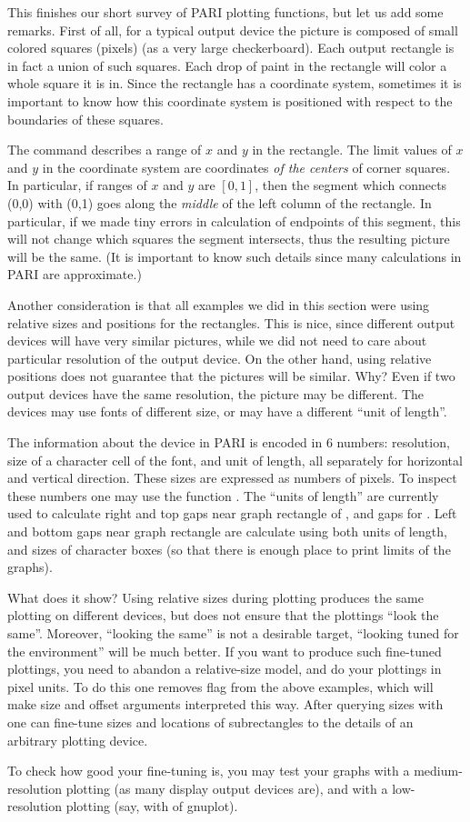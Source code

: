 This finishes our short survey of PARI plotting functions, but let us add
some remarks.  First of all, for a typical output device the picture is
composed of small colored squares (pixels) (as a very large checkerboard).
Each output rectangle is in fact a union of such squares.  Each drop
of paint in the rectangle will color a whole square it is in.  Since the
rectangle has a coordinate system, sometimes it is important to know how
this coordinate system is positioned with respect to the boundaries of
these squares.

The command  describes a range of $x$ and $y$ in the
rectangle.  The limit values of $x$ and $y$ in the coordinate system are
coordinates {\it of the centers} of corner squares.  In particular,
if ranges of $x$ and $y$ are $[0,1]$, then the segment which connects (0,0)
with (0,1) goes along the {\it middle} of the left column of the rectangle.
In particular, if we made tiny errors in calculation of endpoints of this
segment, this will not change which squares the segment intersects, thus
the resulting picture will be the same.  (It is important to know such details
since many calculations in PARI are approximate.)

Another consideration is that all examples we did in this section were
using relative sizes and positions for the rectangles.  This is nice, since
different output devices will have very similar pictures, while we
did not need to care about particular resolution of the output device.
On the other hand,
using relative positions does not guarantee that the pictures will be
similar.  Why?  Even if two output devices have the same resolution,
the picture may be different.  The devices may use fonts of different
size, or may have a different ``unit of length''.

The information about the device in PARI is encoded in 6 numbers: resolution,
size of a character cell of the font, and unit of length, all separately
for horizontal and vertical direction.  These sizes are expressed as
numbers of pixels.  To inspect these numbers one may use the function
.  The ``units of length'' are currently used to calculate
right and top gaps near graph rectangle of , and gaps for
.  Left and bottom gaps near graph rectangle are calculate
using both units of length, and sizes of character boxes (so that there
is enough place to print limits of the graphs).

What does it show?  Using relative sizes during plotting produces
 the same plotting on different devices, but does not
ensure that the plottings ``look the same''.  Moreover, ``looking the
same'' is not a desirable target, ``looking tuned for the environment''
will be much better.  If you want to produce such fine-tuned plottings,
you need to abandon a relative-size model, and do your plottings in
pixel units.  To do this one removes flag  from the above
examples, which will make size and offset arguments interpreted this way.
After querying sizes with  one can fine-tune sizes and
locations of subrectangles to the details of an arbitrary plotting
device.

To check how good your fine-tuning is, you may test your graphs with a
medium-resolution plotting (as many display output devices are), and
with a low-resolution plotting (say, with  of gnuplot).
\vfill\eject\bye
